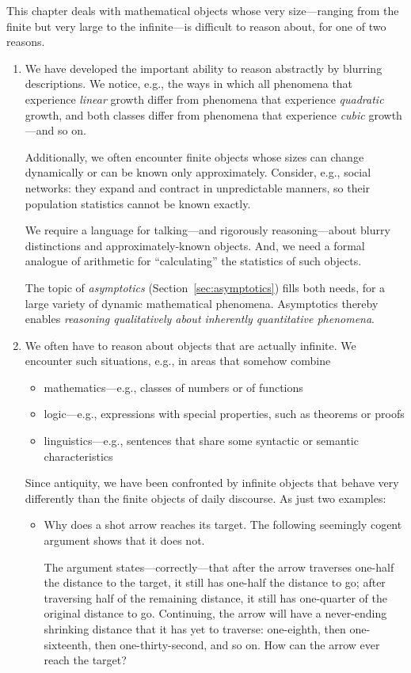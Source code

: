 This chapter deals with mathematical objects whose very size---ranging
from the finite but very large to the infinite---is difficult to
reason about, for one of two reasons.
\begin{enumerate}
\item
We have developed the important ability to reason abstractly by
blurring descriptions.  We notice, e.g., the ways in which all
phenomena that experience {\em linear} growth differ from phenomena
that experience {\em quadratic} growth, and both classes differ from
phenomena that experience {\em cubic} growth---and so on.

Additionally, we often encounter finite objects whose sizes can change
dynamically or can be known only approximately.  Consider, e.g.,
social networks: they expand and contract in unpredictable manners, so
their population statistics cannot be known exactly.

We require a language for talking---and rigorously reasoning---about
blurry distinctions and approximately-known objects.  And, we need a
formal analogue of arithmetic for ``calculating'' the statistics of
such objects.

The topic of {\it asymptotics} (Section~\ref{sec:asymptotics}) fills
both needs, for a large variety of dynamic mathematical phenomena.
Asymptotics thereby enables {\em reasoning qualitatively about
  inherently quantitative phenomena}.

\item
We often have to reason about objects that are actually infinite.  We
encounter such situations, e.g., in areas that somehow combine
  \begin{itemize}
  \item
mathematics---e.g., classes of numbers or of functions
  \item
logic---e.g., expressions with special properties, such as theorems or
proofs
  \item
linguistics---e.g., sentences that share some syntactic or semantic
characteristics
  \end{itemize}
Since antiquity, we have been confronted by infinite objects that
behave very differently than the finite objects of daily discourse.
As just two examples:
  \begin{itemize}
  \item
Why does a shot arrow reaches its target.  The following seemingly
cogent argument shows that it does not.

The argument states---correctly---that after the arrow traverses
one-half the distance to the target, it still has one-half the
distance to go; after traversing half of the remaining distance, it
still has one-quarter of the original distance to go.  Continuing, the
arrow will have a never-ending shrinking distance that it has yet to
traverse: one-eighth, then one-sixteenth, then one-thirty-second, and
so on.  How can the arrow ever reach the target?


\end{itemize}
\end{enumerate}
